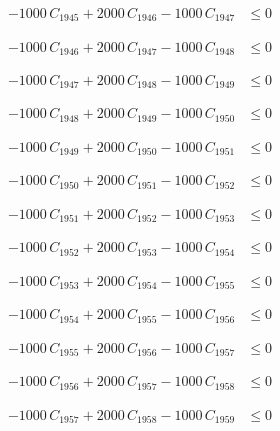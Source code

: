 \documentclass[a4paper,11pt]{article}
\begin{document}
\begin{align}
-1000\,C_{1945} + 2000\,C_{1946} - 1000\,C_{1947} &\leq 0 \nonumber
\end{align}

\begin{align}
-1000\,C_{1946} + 2000\,C_{1947} - 1000\,C_{1948} &\leq 0 \nonumber
\end{align}

\begin{align}
-1000\,C_{1947} + 2000\,C_{1948} - 1000\,C_{1949} &\leq 0 \nonumber
\end{align}

\begin{align}
-1000\,C_{1948} + 2000\,C_{1949} - 1000\,C_{1950} &\leq 0 \nonumber
\end{align}

\begin{align}
-1000\,C_{1949} + 2000\,C_{1950} - 1000\,C_{1951} &\leq 0 \nonumber
\end{align}

\begin{align}
-1000\,C_{1950} + 2000\,C_{1951} - 1000\,C_{1952} &\leq 0 \nonumber
\end{align}

\begin{align}
-1000\,C_{1951} + 2000\,C_{1952} - 1000\,C_{1953} &\leq 0 \nonumber
\end{align}

\begin{align}
-1000\,C_{1952} + 2000\,C_{1953} - 1000\,C_{1954} &\leq 0 \nonumber
\end{align}

\begin{align}
-1000\,C_{1953} + 2000\,C_{1954} - 1000\,C_{1955} &\leq 0 \nonumber
\end{align}

\begin{align}
-1000\,C_{1954} + 2000\,C_{1955} - 1000\,C_{1956} &\leq 0 \nonumber
\end{align}

\begin{align}
-1000\,C_{1955} + 2000\,C_{1956} - 1000\,C_{1957} &\leq 0 \nonumber
\end{align}

\begin{align}
-1000\,C_{1956} + 2000\,C_{1957} - 1000\,C_{1958} &\leq 0 \nonumber
\end{align}

\begin{align}
-1000\,C_{1957} + 2000\,C_{1958} - 1000\,C_{1959} &\leq 0 \nonumber
\end{align}
\end{document}
